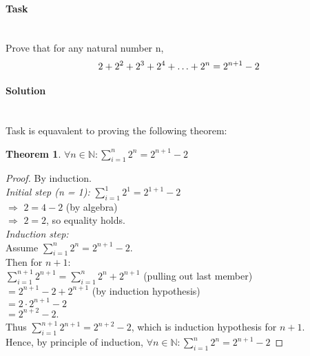\documentclass[11pt]{article}
\begin{document}
   \paragraph{Task}\mbox{} \\
   Prove that for any natural number n,
   \begin{equation*}
      2 + 2^{2} + 2^{3} + 2^{4} + \mathellipsis + 2^{n} = 2^{n+1} - 2
   \end{equation*}
   \paragraph{Solution}\mbox{} \\
   Task is equavalent to proving the following theorem:
   \newtheorem*{Theorem}{Theorem}
   \begin{Theorem}
       $\displaystyle \forall n \in \mathbb{N}: \sum_{i=1}^{n}2^{n} = 2^{n+1} - 2$
   \end{Theorem}
   \begin{proof}
   By induction. \\
   \emph{Initial step (n = 1):} $\displaystyle \sum_{i=1}^{1}2^{1} = 2^{1+1} - 2$\\
   $\Rightarrow$ $2 = 4 - 2$ (by algebra)\\
   $\Rightarrow$ $2 = 2$, so equality holds.\\
   \emph{Induction step:} \\
   Assume $\displaystyle \sum_{i=1}^{n}2^{n} = 2^{n+1} - 2$. \\
   Then for $n + 1$: \\
   $\displaystyle \sum_{i=1}^{n + 1}2^{n + 1} = \sum_{i=1}^{n}2^{n} + 2^{n + 1}$ (pulling out last member)  \\
   $= 2^{n + 1} - 2 + 2^{n + 1}$ (by induction hypothesis)  \\
   $= 2\cdot2^{n + 1} - 2$ \\
   $= 2^{n + 2} - 2$. \\
   Thus $\displaystyle \sum_{i=1}^{n + 1}2^{n + 1} = 2^{n+2} - 2$, which is induction hypothesis for $n + 1$. \\
   Hence, by principle of induction,
   $\displaystyle \forall n \in \mathbb{N}: \sum_{i=1}^{n}2^{n} = 2^{n+1} - 2$
   \end{proof}
\end{document}
